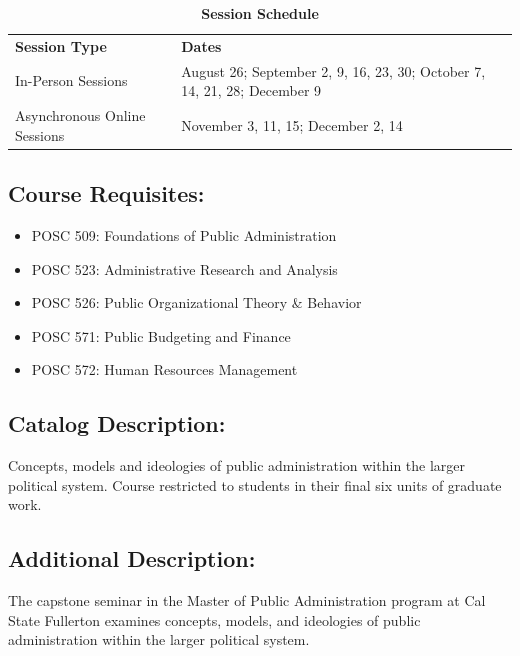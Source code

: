 \documentclass[12pt]{article}     %
\begin{document}
    \begin{center}
    \begin{table}[h]
        \caption{\textbf{Session Schedule}}
        \label{tab:session-schedule}
        \centering
        \begin{tabularx}{\linewidth}{>{\hsize}L >{\hsize}L}
            \textbf{Session Type} & \textbf{Dates} \\
            In-Person Sessions & August 26; September 2, 9, 16, 23, 30; October 7, 14, 21, 28; December 9 \\
            Asynchronous Online Sessions & November 3, 11, 15; December 2, 14 \\
        \end{tabularx}
    \end{table}
    \end{center}

	\subsection*{Course Requisites:}
		\begin{itemize}
            \item POSC 509: Foundations of Public Administration
            \item POSC 523: Administrative Research and Analysis
            \item POSC 526: Public Organizational Theory \& Behavior
            \item POSC 571: Public Budgeting and Finance
            \item POSC 572: Human Resources Management
		\end{itemize}

	\subsection*{Catalog Description:} 
		Concepts, models and ideologies of public administration within the larger political system. Course restricted to students in their final six units of graduate work.

	\subsection*{Additional Description:}
		The capstone seminar in the Master of Public Administration program at Cal State Fullerton examines concepts, models, and ideologies of public administration within the larger political system.
\end{document}
